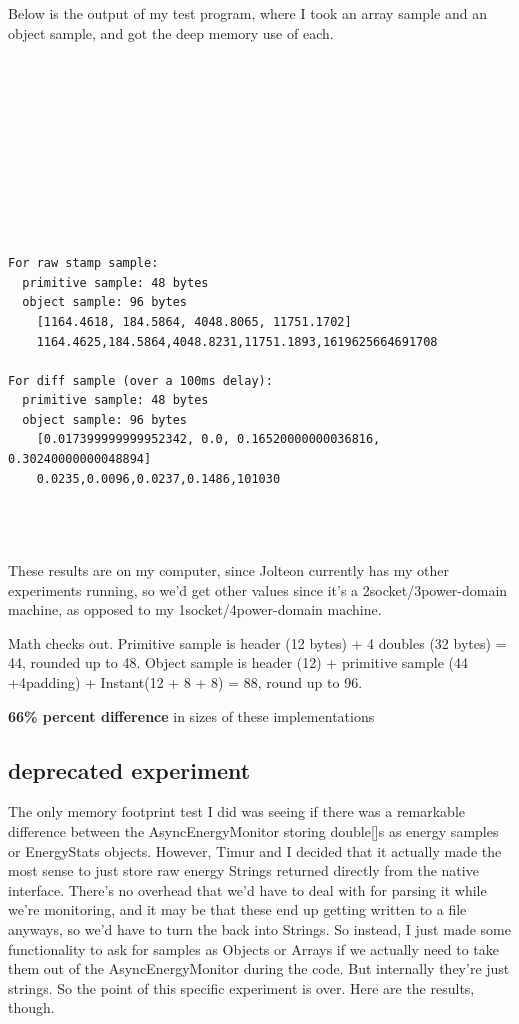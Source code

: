 \documentclass{article}
\begin{document}
Below is the output of my test program, where I took an array sample and an object
sample, and got the deep memory use of each.
\begin{verbatim}










For raw stamp sample:
  primitive sample: 48 bytes
  object sample: 96 bytes
    [1164.4618, 184.5864, 4048.8065, 11751.1702]
    1164.4625,184.5864,4048.8231,11751.1893,1619625664691708

For diff sample (over a 100ms delay):
  primitive sample: 48 bytes
  object sample: 96 bytes
    [0.017399999999952342, 0.0, 0.16520000000036816, 0.30240000000048894]
    0.0235,0.0096,0.0237,0.1486,101030
    
    
    
\end{verbatim}

These results are on my computer, since Jolteon currently has my other experiments
running, so we'd get other values since it's a 2socket/3power-domain machine, as opposed to my 1socket/4power-domain machine.

Math checks out. Primitive sample is header (12 bytes) + 4 doubles (32 bytes) =
44, rounded up to 48.
Object sample is header (12) + primitive sample (44 +4padding) + Instant(12 + 8 + 8) = 88, round up to 96.

\textbf{66\% percent difference} in sizes of these implementations

\subsection{deprecated experiment}
    The only memory footprint test I did was seeing if there was a remarkable difference between the AsyncEnergyMonitor
    storing double[]s as energy samples or EnergyStats objects. However, Timur and I decided that it actually made
    the most sense to just store raw energy Strings returned directly from the native interface. There's no overhead
    that we'd have to deal with for parsing it while we're monitoring, and it may be that these end up getting written
    to a file anyways, so we'd have to turn the back into Strings. So instead, I just made some functionality to ask
    for samples as Objects or Arrays if we actually need to take them out of the AsyncEnergyMonitor during the code. But
    internally they're just strings. So the point of this specific experiment is over. Here are the results, though.
\end{document}
